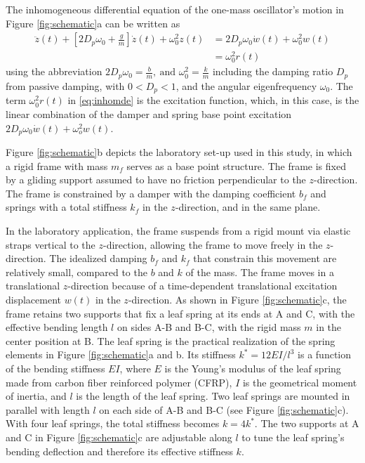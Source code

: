 \documentclass[10pt]{asme2ej}
\begin{document}
%
The inhomogeneous differential equation of the one-mass oscillator's motion in Figure \ref{fig:schematic}a can be written as
%
\begin{equation}
	\begin{aligned}\label{eq:inhomde}
		\ddot z(t) + \left[ 2D_p\omega_0 + \frac gm\right]\dot z(t) + \omega_0^2 z(t) &= 2D_p\omega_0\dot w(t) + \omega_0^2w(t)\\&=\omega_0^2r(t)
	\end{aligned}
\end{equation}
%
using the abbreviation $2D_p\omega_0=\frac bm,\ \text{and }\omega_0^2= \frac km$ including the damping ratio $D_p$ from passive damping, with $0<D_p<1$, and the angular eigenfrequency $\omega_0$.
%
The term $\omega_0^2r(t)$ in \eqref{eq:inhomde} is the excitation function, which, in this case, is the linear combination of the damper and spring base point excitation $2D_p\omega_0\dot w(t) + \omega_o^2w(t)$.
%

%
Figure \ref{fig:schematic}b depicts the laboratory set-up used in this study, in which a rigid frame with mass $m_f$ serves as a base point structure. 
%
The frame is fixed by a gliding support assumed to have no friction perpendicular to the $z$-direction.
%
The frame is constrained by a damper with the damping coefficient $b_f$ and springs with a total stiffness $k_f$ in the $z$-direction, and in the same plane. 
%

%
In the laboratory application, the frame suspends from a rigid mount via elastic straps vertical to the $z$-direction, allowing the frame to move freely in the $z$-direction. 
%
The idealized damping $b_f$ and $k_f$ that constrain this movement are relatively small, compared to the $b$ and $k$ of the mass. 
%
The frame moves in a translational $z$-direction because of a time-dependent translational excitation displacement $w(t)$ in the $z$-direction. 
%
As shown in Figure \ref{fig:schematic}c, the frame retains two supports that fix a leaf spring at its ends at A and C, with the effective bending length $l$ on sides A-B and B-C, with the rigid mass $m$ in the center position at B.
%
The leaf spring is the practical realization of the spring elements in Figure \ref{fig:schematic}a and b. 
%
Its stiffness $k^*=12EI/l^3$ is a function of the bending stiffness $EI$, where $E$ is the Young’s modulus of the leaf spring made from carbon fiber reinforced polymer (CFRP), $I$ is the geometrical moment of inertia, and $l$ is the length of the leaf spring.
%
Two leaf springs are mounted in parallel with length $l$ on each side of A-B and B-C (see Figure \ref{fig:schematic}c). 
%
With four leaf springs, the total stiffness becomes $k = 4k^*$. 
%
The two supports at A and C in Figure \ref{fig:schematic}c are adjustable along $l$ to tune the leaf spring’s bending deflection and therefore its effective stiffness $k$.
%
\end{document}
